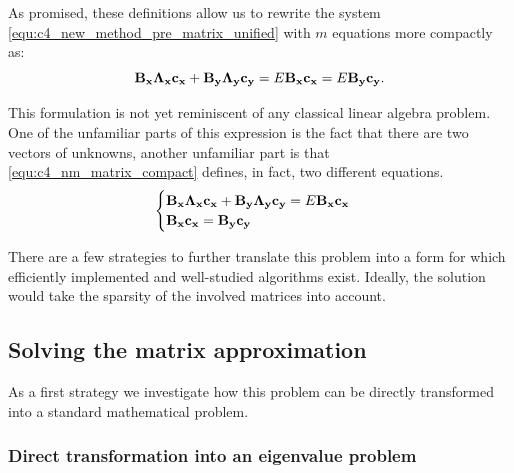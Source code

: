 As promised, these definitions allow us to rewrite the system \eqref{equ:c4_new_method_pre_matrix_unified} with $m$ equations more compactly as:
\begin{equation}\label{equ:c4_nm_matrix_compact}
    \vb{B_x} \vb{\Lambda_x}\vb{c_x} + \vb{B_y} \vb{\Lambda_y}\vb{c_y} = E \vb{B_x} \vb{c_x} = E \vb{B_y} \vb{c_y}\text{.}
\end{equation}

This formulation is not yet reminiscent of any classical linear algebra problem. One of the unfamiliar parts of this expression is the fact that there are two vectors of unknowns, another unfamiliar part is that \eqref{equ:c4_nm_matrix_compact} defines, in fact, two different equations.
\begin{equation}
    \begin{cases}
        \vb{B_x} \vb{\Lambda_x}\vb{c_x} + \vb{B_y} \vb{\Lambda_y}\vb{c_y} = E \vb{B_x} \vb{c_x} \\
        \vb{B_x} \vb{c_x} = \vb{B_y} \vb{c_y}
    \end{cases} \label{equ:c4_new_method_first_matrix_problem}
\end{equation}

There are a few strategies to further translate this problem into a form for which efficiently implemented and well-studied algorithms exist. Ideally, the solution would take the sparsity of the involved matrices into account.

\subsection{Solving the matrix approximation}

As a first strategy we investigate how this problem can be directly transformed into a standard mathematical problem.

\subsubsection{Direct transformation into an eigenvalue problem}\label{sec:c4_nm_direct_transform}

